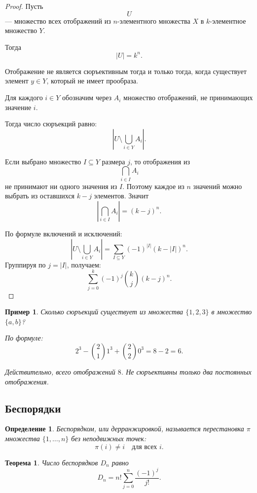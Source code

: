 \documentclass[12pt,a4paper]{article}
\newtheorem{theorem}{Теорема}
\newtheorem{definition}{Определение}
\newtheorem{example}{Пример}
\begin{document}
\begin{proof}
Пусть
\[
U
\]
--- множество всех отображений из $n$-элементного множества $X$ в $k$-элементное множество $Y$.

Тогда
\[
|U|=k^n.
\]

Отображение не является сюръективным тогда и только тогда, когда существует элемент $y\in Y$, который не имеет прообраза.

Для каждого $i\in Y$ обозначим через $A_i$ множество отображений, не принимающих значение $i$.

Тогда число сюръекций равно:
\[
\left|U\setminus\bigcup_{i\in Y}A_i\right|.
\]

Если выбрано множество $I\subseteq Y$ размера $j$, то отображения из
\[
\bigcap_{i\in I}A_i
\]
не принимают ни одного значения из $I$. Поэтому каждое из $n$ значений можно выбрать из оставшихся $k-j$ элементов. Значит
\[
\left|\bigcap_{i\in I}A_i\right|=(k-j)^n.
\]

По формуле включений и исключений:
\[
\left|U\setminus\bigcup_{i\in Y}A_i\right|
=
\sum_{I\subseteq Y}(-1)^{|I|}(k-|I|)^n.
\]
Группируя по $j=|I|$, получаем:
\[
\sum_{j=0}^{k}(-1)^j\binom{k}{j}(k-j)^n.
\]
\end{proof}

\begin{example}
Сколько сюръекций существует из множества $\{1,2,3\}$ в множество $\{a,b\}$?

По формуле:
\[
2^3-\binom{2}{1}1^3+\binom{2}{2}0^3
=
8-2=6.
\]

Действительно, всего отображений $8$. Не сюръективны только два постоянных отображения.
\end{example}

\subsection{Беспорядки}

\begin{definition}
Беспорядком, или дерранжировкой, называется перестановка $\pi$ множества $\{1,\dots,n\}$ без неподвижных точек:
\[
\pi(i)\neq i
\quad \text{для всех } i.
\]
\end{definition}

\begin{theorem}
Число беспорядков $D_n$ равно
\[
D_n
=
n!\sum_{j=0}^{n}\frac{(-1)^j}{j!}.
\]
\end{theorem}
\end{document}
